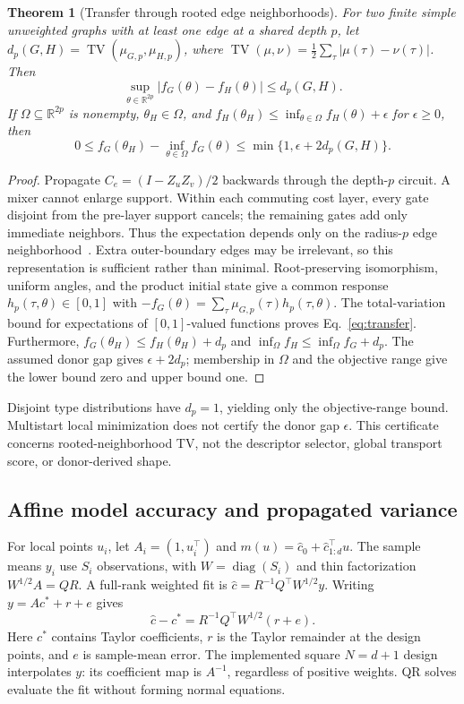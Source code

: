 \documentclass[11pt]{article}
\newcommand{\R}{\mathbb R}
\newcommand{\TV}{\operatorname{TV}}
\newcommand{\diag}{\operatorname{diag}}
\newtheorem{theorem}{Theorem}
\begin{document}
\begin{theorem}[Transfer through rooted edge neighborhoods]
\label{thm:transfer}
For two finite simple unweighted graphs with at least one edge at a shared
depth $p$, let $d_p(G,H)=\TV(\mu_{G,p},\mu_{H,p})$, where
$\TV(\mu,\nu)=\tfrac12\sum_\tau|\mu(\tau)-\nu(\tau)|$. Then
\begin{equation}
 \sup_{\theta\in\R^{2p}}|f_G(\theta)-f_H(\theta)|\le d_p(G,H).
 \label{eq:transfer}
\end{equation}
If $\Omega\subseteq\R^{2p}$ is nonempty, $\theta_H\in\Omega$, and
$f_H(\theta_H)\le\inf_{\theta\in\Omega}f_H(\theta)+\epsilon$ for
$\epsilon\ge0$, then
\begin{equation}
 0\le f_G(\theta_H)-\inf_{\theta\in\Omega}f_G(\theta)
 \le\min\{1,\epsilon+2d_p(G,H)\}.
 \label{eq:transferregret}
\end{equation}
\end{theorem}
\begin{proof}
Propagate $C_e=(I-Z_uZ_v)/2$ backwards through the depth-$p$ circuit.
A mixer cannot enlarge support. Within each commuting cost layer, every
gate disjoint from the pre-layer support cancels; the remaining gates add
only immediate neighbors. Thus the expectation depends only on the
radius-$p$ edge neighborhood~\cite{farhi2014,brandao2018}. Extra outer-boundary
edges may be irrelevant, so this representation is sufficient rather than
minimal. Root-preserving isomorphism, uniform angles, and the product
initial state give a common response $h_p(\tau,\theta)\in[0,1]$ with
$-f_G(\theta)=\sum_\tau\mu_{G,p}(\tau)h_p(\tau,\theta)$.
The total-variation bound for expectations of $[0,1]$-valued functions
proves Eq.~\eqref{eq:transfer}. Furthermore,
$f_G(\theta_H)\le f_H(\theta_H)+d_p$ and
$\inf_\Omega f_H\le\inf_\Omega f_G+d_p$.
The assumed donor gap gives $\epsilon+2d_p$; membership in $\Omega$
and the objective range give the lower bound zero and upper bound one.
\end{proof}
Disjoint type distributions have $d_p=1$, yielding only the objective-range
bound. Multistart local minimization does not certify the donor gap
$\epsilon$. This certificate concerns rooted-neighborhood TV, not the
descriptor selector, global transport score, or donor-derived shape.

\subsection{Affine model accuracy and propagated variance}
For local points $u_i$, let $A_i=(1,u_i^\top)$ and
$m(u)=\widehat c_0+\widehat c_{1:d}^\top u$. The sample means $y_i$
use $S_i$ observations, with $W=\diag(S_i)$ and thin factorization
$W^{1/2}A=QR$. A full-rank weighted fit is
$\widehat c=R^{-1}Q^\top W^{1/2}y$. Writing $y=Ac^*+r+e$ gives
\begin{equation}
 \widehat c-c^*=R^{-1}Q^\top W^{1/2}(r+e).
 \label{eq:qridentity}
\end{equation}
Here $c^*$ contains Taylor coefficients, $r$ is the Taylor remainder at
the design points, and $e$ is sample-mean error. The implemented square
$N=d+1$ design interpolates $y$: its coefficient map is $A^{-1}$, regardless
of positive weights. QR solves evaluate the fit without forming normal equations.
\end{document}
